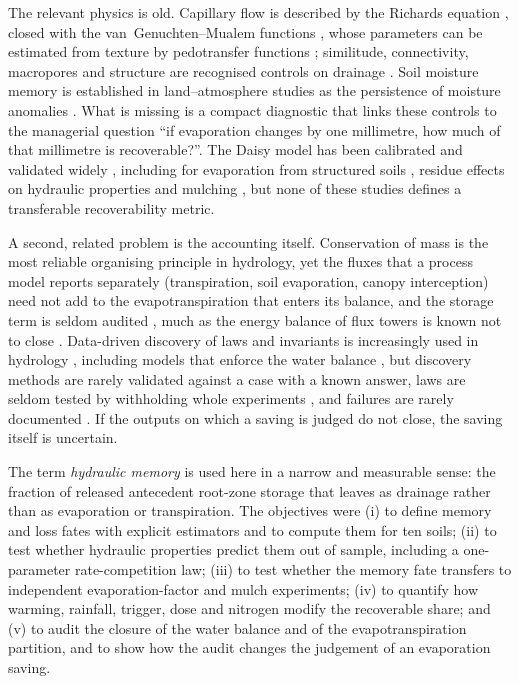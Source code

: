 \documentclass[review,12pt,authoryear]{elsarticle}
\begin{document}
The relevant physics is old. Capillary flow is described by the Richards equation \citep{Richards1931}, closed with the van~Genuchten--Mualem functions \citep{vanGenuchten1980,Mualem1976}, whose parameters can be estimated from texture by pedotransfer functions \citep{Schaap2001,Saxton2006,Vereecken2016,Vereecken2019,Weber2024}; similitude, connectivity, macropores and structure are recognised controls on drainage \citep{Miller1956,Ghanbarian2013,Blunt2017,Beven1982,Beven2013,Jarvis2007,Strudley2008,Fatichi2020}. Soil moisture memory is established in land--atmosphere studies as the persistence of moisture anomalies \citep{Entekhabi1996,Koster2001,Koster2004,Rodriguez2004}. What is missing is a compact diagnostic that links these controls to the managerial question ``if evaporation changes by one millimetre, how much of that millimetre is recoverable?''. The Daisy model has been calibrated and validated widely \citep{Hansen1991,Hansen2012,Holbak2026}, including for evaporation from structured soils \citep{Leuther2024}, residue effects on hydraulic properties \citep{Leuther2026} and mulching \citep{Vuaille2024}, but none of these studies defines a transferable recoverability metric.

A second, related problem is the accounting itself. Conservation of mass is the most reliable organising principle in hydrology, yet the fluxes that a process model reports separately (transpiration, soil evaporation, canopy interception) need not add to the evapotranspiration that enters its balance, and the storage term is seldom audited \citep{Hillel1998,Refsgaard2004}, much as the energy balance of flux towers is known not to close \citep{Wilson2002,Foken2008}. Data-driven discovery of laws and invariants is increasingly used in hydrology \citep{Schmidt2009,Brunton2016,Champion2019,Udrescu2020,Kratzert2018,Kratzert2019,Shen2018,Reichstein2019,Nearing2021,Song2022}, including models that enforce the water balance \citep{Karniadakis2021,Li2024}, but discovery methods are rarely validated against a case with a known answer, laws are seldom tested by withholding whole experiments \citep{Roberts2017}, and failures are rarely documented \citep{Kirchner2006,Oreskes1994}. If the outputs on which a saving is judged do not close, the saving itself is uncertain.

The term \emph{hydraulic memory} is used here in a narrow and measurable sense: the fraction of released antecedent root-zone storage that leaves as drainage rather than as evaporation or transpiration. The objectives were (i) to define memory and loss fates with explicit estimators and to compute them for ten soils; (ii) to test whether hydraulic properties predict them out of sample, including a one-parameter rate-competition law; (iii) to test whether the memory fate transfers to independent evaporation-factor and mulch experiments; (iv) to quantify how warming, rainfall, trigger, dose and nitrogen modify the recoverable share; and (v) to audit the closure of the water balance and of the evapotranspiration partition, and to show how the audit changes the judgement of an evaporation saving.
\end{document}

